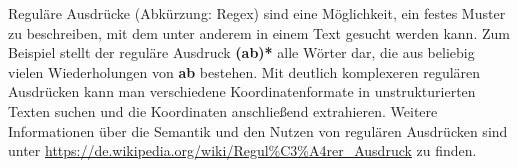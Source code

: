 Reguläre Ausdrücke (Abkürzung: Regex) sind eine Möglichkeit, ein festes Muster zu beschreiben, mit dem unter anderem in einem Text gesucht werden kann.
Zum Beispiel stellt der reguläre Ausdruck \textbf{(ab)*} alle Wörter dar, die aus beliebig vielen Wiederholungen von \textbf{ab} bestehen.
Mit deutlich komplexeren regulären Ausdrücken kann man verschiedene Koordinatenformate in unstrukturierten Texten suchen und die Koordinaten anschließend extrahieren.
Weitere Informationen über die Semantik und den Nutzen von regulären Ausdrücken sind unter \url{https://de.wikipedia.org/wiki/Regul%C3%A4rer_Ausdruck} zu finden.